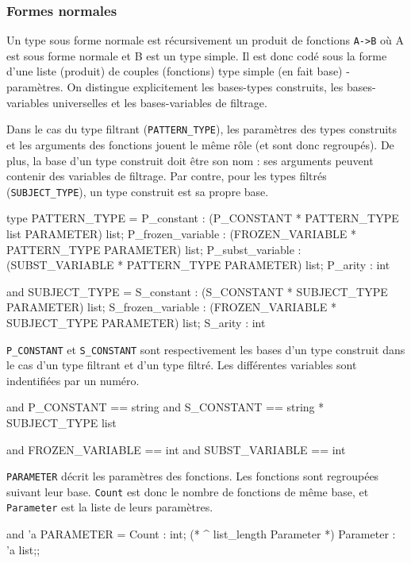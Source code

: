 \subsubsection{Formes normales}

Un type sous forme normale est r{\'e}cursivement un produit de fonctions
\verb$A->B$ o{\`u} A est sous forme normale et B est un type simple. Il est 
donc cod{\'e} sous la forme d'une liste (produit) de couples (fonctions)
type simple (en fait base) - param{\`e}tres. On distingue explicitement
les bases-types construits, les bases-variables universelles et les
bases-variables de filtrage.

Dans le cas du type filtrant (\verb$PATTERN_TYPE$), les param{\`e}tres des
types construits et les arguments des fonctions jouent le m{\^e}me r{\^o}le
(et sont donc regroup{\'e}s). De plus, la base d'un type construit doit
{\^e}tre son nom : ses arguments peuvent contenir des variables de
filtrage. Par contre, pour les types filtr{\'e}s (\verb$SUBJECT_TYPE$), un
type construit est sa propre base.

\begin{caml_code}
type PATTERN_TYPE =
  {P_constant : (P_CONSTANT * PATTERN_TYPE list PARAMETER) list;
   P_frozen_variable : (FROZEN_VARIABLE * PATTERN_TYPE PARAMETER) list;
   P_subst_variable : (SUBST_VARIABLE * PATTERN_TYPE PARAMETER) list;
   P_arity : int}

and SUBJECT_TYPE =
  {S_constant : (S_CONSTANT * SUBJECT_TYPE PARAMETER) list;
   S_frozen_variable : (FROZEN_VARIABLE * SUBJECT_TYPE PARAMETER) list;
   S_arity : int}
\end{caml_code}

\verb$P_CONSTANT$ et \verb$S_CONSTANT$ sont respectivement les bases d'un
type construit dans le cas d'un type filtrant et d'un type filtr{\'e}. Les
diff{\'e}rentes variables sont indentifi{\'e}es par un num{\'e}ro.

\begin{caml_code}
and P_CONSTANT == string
and S_CONSTANT == string * SUBJECT_TYPE list

and FROZEN_VARIABLE == int
and SUBST_VARIABLE == int
\end{caml_code}

\verb$PARAMETER$ d{\'e}crit les param{\`e}tres des fonctions. Les fonctions sont
regroup{\'e}es suivant leur base. \verb$Count$ est donc le nombre de fonctions de
m{\^e}me base, et \verb$Parameter$ est la liste de leurs param{\`e}tres.

\begin{caml_code}
and 'a PARAMETER =
  {Count : int;
         (* ^ list_length Parameter *)
   Parameter : 'a list};;
\end{caml_code}

